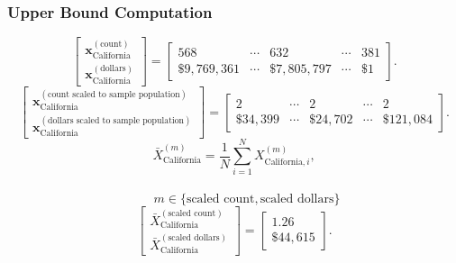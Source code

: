 \subsubsection{Upper Bound Computation}
\[
\begin{bmatrix}
\mathbf{x}_{\text{California}}^{(\text{count})}\\
\mathbf{x}_{\text{California}}^{(\text{dollars})}
\end{bmatrix}
=
\begin{bmatrix}
568 & \cdots & 632 & \cdots & 381\\
\$9{,}769{,}361 & \cdots & \$7{,}805{,}797 & \cdots & \$1
\end{bmatrix}.
\]
\[
\begin{bmatrix}
\mathbf{x}_{\text{California}}^{(\text{count scaled to sample population})}\\
\mathbf{x}_{\text{California}}^{(\text{dollars scaled to sample population})}
\end{bmatrix}
=
\begin{bmatrix}
2 & \cdots & 2 & \cdots & 2\\
\$34{,}399 & \cdots & \$24{,}702 & \cdots & \$121{,}084
\end{bmatrix}.
\]
\[
\bar{X}_{\text{California}}^{(m)}
= \frac{1}{N}\sum_{i=1}^{N} X_{\text{California},i}^{(m)},
\]
\\
\[
\qquad
m \in \{\text{scaled count},\text{scaled dollars}\}
\]
\[
\begin{bmatrix}
\bar{X}_{\text{California}}^{(\text{scaled count})}\\
\bar{X}_{\text{California}}^{(\text{scaled dollars})}
\end{bmatrix}
=
\begin{bmatrix}
1.26\\
\$44{,}615
\end{bmatrix}.
\]
